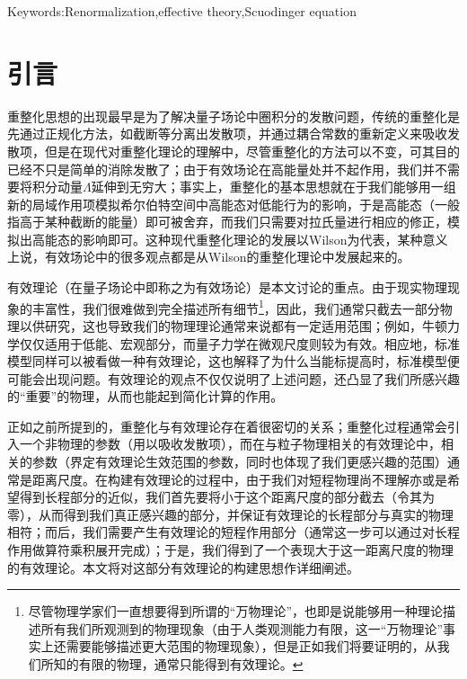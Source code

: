 \documentclass[cs4size,titlepage,twoside]{ctexart}
\begin{document}
Keywords:Renormalization,effective theory,Scuodinger equation
\cleardoublepage
{}
\section*{引言}
重整化思想的出现最早是为了解决量子场论中圈积分的发散问题\cite{Whatis}，传统的重整化是先通过正规化方法，如截断等分离出发散项，并通过耦合常数的重新定义来吸收发散项，但是在现代对重整化理论的理解中，尽管重整化的方法可以不变，可其目的已经不只是简单的消除发散了；由于有效场论在高能量处并不起作用，我们并不需要将积分动量$\Lambda$延伸到无穷大；事实上，重整化的基本思想就在于我们能够用一组新的局域作用项模拟希尔伯特空间中高能态对低能行为的影响，于是高能态（一般指高于某种截断的能量）即可被舍弃，而我们只需要对拉氏量进行相应的修正，模拟出高能态的影响即可\cite{vanKolck:1999mw}。这种现代重整化理论的发展以Wilson为代表，某种意义上说，有效场论中的很多观点都是从Wilson的重整化理论中发展起来的。


有效理论（在量子场论中即称之为有效场论）是本文讨论的重点。由于现实物理现象的丰富性，我们很难做到完全描述所有细节\footnote{尽管物理学家们一直想要得到所谓的“万物理论”，也即是说能够用一种理论描述所有我们所观测到的物理现象（由于人类观测能力有限，这一“万物理论”事实上还需要能够描述更大范围的物理现象），但是正如我们将要证明的，从我们所知的有限的物理，通常只能得到有效理论。}，因此，我们通常只截去一部分物理以供研究，这也导致我们的物理理论通常来说都有一定适用范围\cite{Manohar:1996cq}；例如，牛顿力学仅仅适用于低能、宏观部分，而量子力学在微观尺度则较为有效。相应地，标准模型同样可以被看做一种有效理论，这也解释了为什么当能标提高时，标准模型便可能会出现问题。有效理论的观点不仅仅说明了上述问题，还凸显了我们所感兴趣的“重要”的物理，从而也能起到简化计算的作用。

正如之前所提到的，重整化与有效理论存在着很密切的关系；重整化过程通常会引入一个非物理的参数（用以吸收发散项），而在与粒子物理相关的有效理论中，相关的参数（界定有效理论生效范围的参数，同时也体现了我们更感兴趣的范围）通常是距离尺度。在构建有效理论的过程中，由于我们对短程物理尚不理解亦或是希望得到长程部分的近似，我们首先要将小于这个距离尺度的部分截去（令其为零），从而得到我们真正感兴趣的部分，并保证有效理论的长程部分与真实的物理相符；而后，我们需要产生有效理论的短程作用部分（通常这一步可以通过对长程作用做算符乘积展开完成）\cite{EFT}；于是，我们得到了一个表现大于这一距离尺度的物理的有效理论。本文将对这部分有效理论的构建思想作详细阐述。
\end{document}
